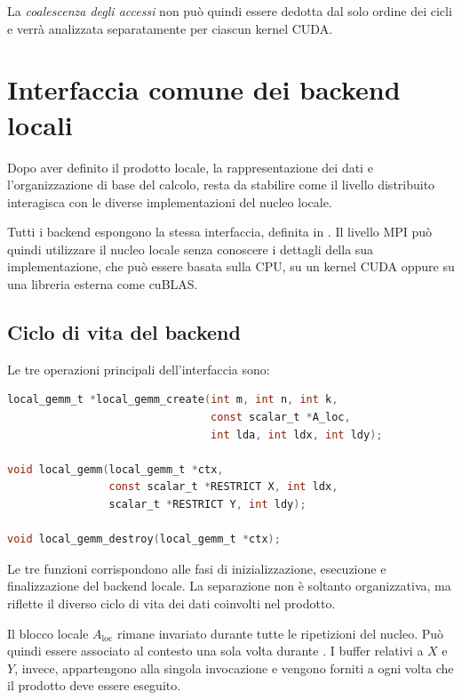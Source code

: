 La \emph{coalescenza degli accessi} non può quindi essere dedotta dal solo
ordine dei cicli e verrà analizzata separatamente per ciascun kernel CUDA.


\section{Interfaccia comune dei backend locali}
\label{sec:interfaccia-locale}

Dopo aver definito il prodotto locale, la rappresentazione dei dati e
l'organizzazione di base del calcolo, resta da stabilire come il livello
distribuito interagisca con le diverse implementazioni del nucleo locale.

Tutti i backend espongono la stessa interfaccia, definita in
. Il livello MPI può quindi utilizzare il nucleo
locale senza conoscere i dettagli della sua implementazione, che può essere
basata sulla CPU, su un kernel CUDA oppure su una libreria esterna come
cuBLAS.

\subsection{Ciclo di vita del backend}\label{sec:tre-fasi}

Le tre operazioni principali dell'interfaccia sono:

\begin{lstlisting}[language=C,caption={Operazioni principali dell'interfaccia definita in \file{src/kernel/kernel.h}.}]
local_gemm_t *local_gemm_create(int m, int n, int k,
                                const scalar_t *A_loc,
                                int lda, int ldx, int ldy);

void local_gemm(local_gemm_t *ctx,
                const scalar_t *RESTRICT X, int ldx,
                scalar_t *RESTRICT Y, int ldy);

void local_gemm_destroy(local_gemm_t *ctx);
\end{lstlisting}

Le tre funzioni corrispondono alle fasi di inizializzazione, esecuzione e
finalizzazione del backend locale. La separazione non è soltanto
organizzativa, ma riflette il diverso ciclo di vita dei dati coinvolti nel
prodotto.

Il blocco locale $A_{\mathrm{loc}}$ rimane invariato durante tutte le
ripetizioni del nucleo. Può quindi essere associato al contesto una sola
volta durante . I buffer relativi a $X$ e $Y$,
invece, appartengono alla singola invocazione e vengono forniti a
 ogni volta che il prodotto deve essere eseguito.

